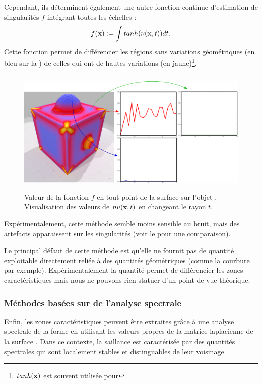 %
Cependant, ils déterminent également une autre fonction continue d'estimation de
singularités $f$ intégrant toutes les échelles :
%
\begin{equation}
   f(\mathbf{x}) := \int tanh(\nu(\mathbf{x},t)) dt .
\end{equation}
%
Cette fonction permet de différencier les régions sans variations géométriques (en bleu sur
la ) de celles qui ont de hautes variations
(en jaune)\footnote{$tanh(\mathbf{x})$ est souvent utilisée pour }.
%
\begin{figure}[ht]{
  \begin{center}
    \includegraphics[height=6cm]{figures/CubeSpherePlotMellado}
  \end{center}}
  \caption[Valeur de la fonction $f$ en tout point de la surface sur
  l'objet \CubeSphere.]{Valeur de la fonction $f$ en tout point de la surface sur
  l'objet \CubeSphere. Visualisation des valeurs de $nu(\mathbf{x},t)$ en changeant le
  rayon $t$. \label{fig:mellado-cubesphere}}
\end{figure}
%
Expérimentalement, cette méthode semble moins sensible au bruit, mais des
artefacts apparaissent sur les singularités (voir le
 pour une comparaison).


Le principal défaut de cette méthode est qu'elle ne fournit pas de quantité
exploitable directement reliée à des quantités géométriques (comme la courbure
par exemple). Expérimentalement la quantité permet de différencier les zones
caractéristiques mais nous ne pouvons rien statuer d'un point de vue théorique.
%
\subsubsection{Méthodes basées sur de l'analyse spectrale}%
\label{sec:applications:feature:spectral}
%
Enfin, les zones caractéristiques peuvent être extraites grâce à une analyse
spectrale de la forme en utilisant les valeurs propres de la matrice laplacienne
de la surface \cite{GebalBAL09,Sun2009,Song2014}. Dans ce contexte, la saillance
est caractérisée par des quantités spectrales qui sont localement stables et
distinguables de leur voisinage.
%
